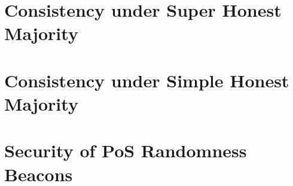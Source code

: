 \documentclass[11pt,oneside]{book}
\begin{document}

\singlespacing

\setcounter{tocdepth}{1}
\tableofcontents

\listoffigures

\listoftables

\thispagestyle{plain}
\mainmatter
\doublespacing





\part{Consistency under Super Honest Majority}


\part{Consistency under Simple Honest Majority}


\part{Security of PoS Randomness Beacons}



\singlespacing
\newpage
{}
  


\appendix
{}

\end{document}
